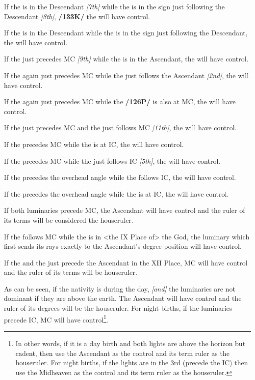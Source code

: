 If the \Sun\xspace is in the Descendant \textsl{[7th]} while the \Moon\xspace is in the sign just following the Descendant \textsl{[8th]}, \textbf{/133K/} the \Sun\xspace will have control. 

If the \Moon\xspace is in the Descendant while the \Sun\xspace is in the sign just following the Descendant, the \Sun\xspace will have control. 

If the \Sun\xspace just precedes MC \textsl{[9th]} while the \Moon\xspace is in the Ascendant, the \Moon\xspace will have control. 

If the \Sun\xspace again just precedes MC while the \Moon\xspace just follows the Ascendant \textsl{[2nd]}, the \Moon\xspace will have control. 

If the \Sun\xspace again just precedes MC while the \Moon\xspace \textbf{/126P/} is also at MC, the \Moon\xspace will have control. 

If the \Sun\xspace just precedes MC and the \Moon\xspace just follows MC \textsl{[11th]}, the \Moon\xspace will have control. 

If the \Moon\xspace precedes MC while the \Sun\xspace is at IC, the \Sun\xspace will have control. 

If the \Moon\xspace precedes MC while the \Sun\xspace just follows IC \textsl{[5th]}, the \Sun\xspace will have control. 

If the \Sun\xspace precedes the overhead angle while the \Moon\xspace follows IC, the \Moon\xspace will have control. 

If the \Sun\xspace precedes the overhead angle while the \Moon\xspace is at IC, the \Moon\xspace will have control. 

If both luminaries precede MC, the Ascendant will have control and the ruler of its terms will be considered the houseruler. 

If the \Moon\xspace follows MC while the \Sun\xspace is in <the IX Place of> the God, the luminary which first sends its rays exactly to the Ascendant’s degree-position will have control. 

If the \Sun\xspace and the \Moon\xspace just precede the Ascendant in the XII Place, MC will have control and the ruler of its terms will be houseruler.

As can be seen, if the nativity is during the day, \textsl{[and]} the luminaries are not dominant if they are above the earth. The Ascendant will have control and the ruler of its degrees will be the houseruler. For night births, if the luminaries precede IC, MC will have control\footnote{In other words, if it is a day birth and both lights are above the horizon but cadent, then use the Ascendant as the control and its term ruler as the houseruler. For night births, if the lights are in the 3rd (precede the IC) then use the Midheaven as the control and its term ruler as the houseruler.}.

